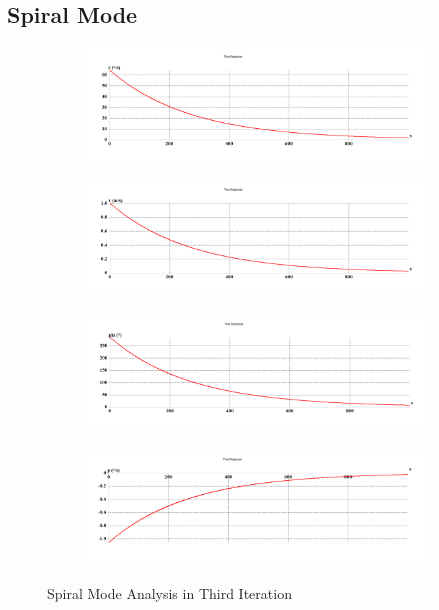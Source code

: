 \subsection{Spiral Mode}
\begin{figure}[H]
\begin{subfigure}{0.48\textwidth}
\includegraphics[width = \linewidth]{r3.png}
\end{subfigure}
\begin{subfigure}{0.48\textwidth}
\includegraphics[width = \linewidth]{v3.png}
\end{subfigure}
\medskip
\begin{subfigure}{0.48\textwidth}
\includegraphics[width = \linewidth]{phi3.png}
\end{subfigure}
\begin{subfigure}{0.48\textwidth}
\includegraphics[width = \linewidth]{p3.png}
\end{subfigure}
\caption{Spiral Mode Analysis in Third Iteration}
\end{figure}
